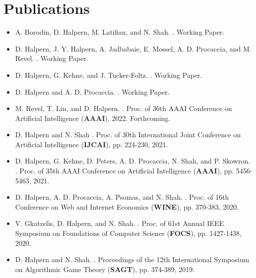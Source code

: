 \documentclass{article}
\newcommand{\link}[2]{\iftoggle{uselinks}{\href{#1}{#2}}{#2}}
\newcommand{\itlink}[2]{\link{https://daniel-halpern.com/files/#1.pdf}{\textit{#2}}}
\begin{document}
    \section{Publications}
    \begin{itemize}
        \setlength\itemsep{1.3ex}
        \item A. Borodin, D. Halpern, M. Latifian, and N. Shah. \itlink{distortion-top-t}{Distortion in Voting with Top-t Preferences}. Working Paper. 
        
        \item D. Halpern, J. Y. Halpern, A. Jadbabaie, E. Mossel, A. D. Procaccia, and M. Revel. \itlink{fluid-defense}{In Defense of Fluid Democracy}. Working Paper.
        
        \item D. Halpern, G. Kehne, and J. Tucker-Foltz. \itlink{buyers-reveal}{Can Buyers Reveal for a Better Deal?}. Working Paper.
        
        \item D. Halpern and A. D. Procaccia. \itlink{unbiased-information}{Unbiased Information Packets}. Working Paper.
        
        \item M. Revel, T. Lin, and D. Halpern. \itlink{optimal-congress}{How Many Representatives Do We Need? The Optimal Size of an Epistemic Congress}.
        Proc. of 36th AAAI Conference on Artificial Intelligence (\textbf{AAAI}), 2022. Forthcoming. 
        
        \item D. Halpern and N. Shah \itlink{distortion-fair-division}{Fair and Efficient Resource Allocation with Partial Information}.
        Proc. of 30th International Joint Conference on Artificial Intelligence (\textbf{IJCAI}), pp. 224-230, 2021. 
        
        \item D. Halpern, G. Kehne, D. Peters, A. D. Procaccia, N. Shah, and P. Skowron. \itlink{ranked-binary-judgments}{Aggregating Binary Judgments Ranked By Accuracy}.
        Proc. of 35th AAAI Conference on Artificial Intelligence (\textbf{AAAI}), pp. 5456-5463, 2021. 

        \item D. Halpern, A. D. Procaccia, A. Psomas, and N. Shah. \itlink{binary-mnw}{Fair Division with Binary Valuations: One
        Rule to Rule
        Them All}. Proc. of 16th Conference on Web and Internet Economics (\textbf{WINE}), pp. 370-383, 2020.
        
        \item V. Gkatzelis, D. Halpern, and N. Shah. \itlink{optimal-metric-distortion}{Resolving the Optimal Metric Distortion Conjecture}.
        Proc. of 61st Annual IEEE Symposium on Foundations of Computer Science (\textbf{FOCS}), pp. 1427-1438, 2020.

        \item D. Halpern and N. Shah. \itlink{fair-division-subsidy-full}{Fair Division with Subsidy}. Proceedings of the 12th International Symposium on
        Algorithmic Game Theory (\textbf{SAGT}), pp. 374-389, 2019.

    \end{itemize}
\end{document}
